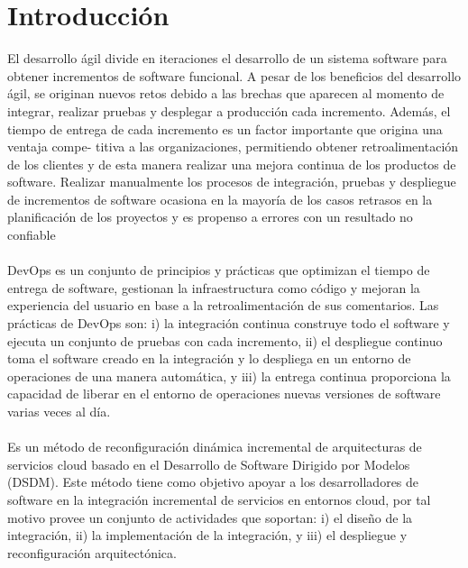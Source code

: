 \documentclass[preprint,12pt]{elsarticle}
\begin{document}
\section{Introducción}
El desarrollo ágil divide en iteraciones el desarrollo de un sistema software para
obtener incrementos de software funcional. A pesar de los beneficios del desarrollo
ágil, se originan nuevos retos debido a las brechas que aparecen al momento de integrar, realizar pruebas y desplegar a producción cada incremento. Además, el tiempo
de entrega de cada incremento es un factor importante que origina una ventaja compe-
titiva a las organizaciones, permitiendo obtener retroalimentación de los clientes y de
esta manera realizar una mejora continua de los productos de software.
Realizar manualmente los procesos de integración, pruebas y despliegue de incrementos de software ocasiona en la mayoría de los casos retrasos en la planificación de
los proyectos y es propenso a errores con un resultado no confiable
\\
\\
DevOps es un
conjunto de principios y prácticas que optimizan el tiempo de entrega de software,
gestionan la infraestructura como código y mejoran la experiencia del usuario en base
a la retroalimentación de sus comentarios. Las prácticas de DevOps  son:
 i) la integración continua construye todo el software y ejecuta un conjunto de pruebas con
cada incremento, ii) el despliegue continuo toma el software creado en la integración
y lo despliega en un entorno de operaciones de una manera automática, y iii) la entrega continua proporciona la capacidad de liberar en el entorno de operaciones nuevas
versiones de software varias veces al día.
\\
\\
Es un método de reconfiguración dinámica incremental de arquitecturas
de servicios cloud basado en el Desarrollo de Software Dirigido por Modelos
(DSDM). Este método tiene como objetivo apoyar a los desarrolladores de software
en la integración incremental de servicios en entornos cloud, por tal motivo provee un
conjunto de actividades que soportan: i) el diseño de la integración, ii) la implementación de la integración, y iii) el despliegue y reconfiguración arquitectónica.

\end{document}
